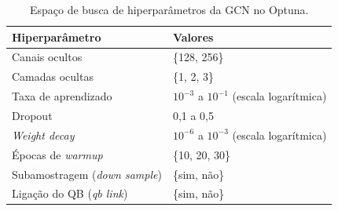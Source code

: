 \begin{table}[htbp]
    \centering
    \caption{Espa\c{c}o de busca de hiperpar\^ametros da GCN no Optuna.}
    \label{tab:espaco_busca}
    \begin{tabular}{ll}
        \hline
        Hiperpar\^ametro & Valores \\
        \hline
        Canais ocultos & \{128, 256\} \\
        Camadas ocultas & \{1, 2, 3\} \\
        Taxa de aprendizado & $10^{-3}$ a $10^{-1}$ (escala logar\'itmica) \\
        Dropout & 0,1 a 0,5 \\
        \textit{Weight decay} & $10^{-6}$ a $10^{-3}$ (escala logar\'itmica) \\
        \'Epocas de \textit{warmup} & \{10, 20, 30\} \\
        Subamostragem (\textit{down sample}) & \{sim, n\~ao\} \\
        Liga\c{c}\~ao do QB (\textit{qb link}) & \{sim, n\~ao\} \\
        \hline
    \end{tabular}
\end{table}
